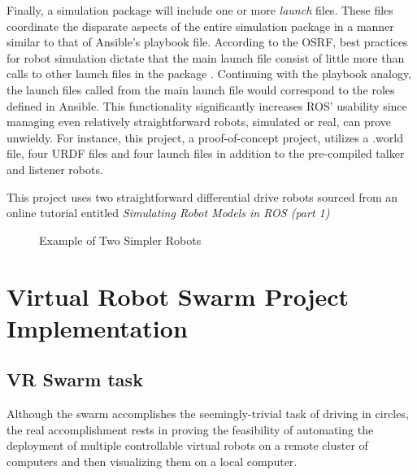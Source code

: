 \documentclass[9pt,twocolumn,twoside]{../../styles/osajnl}
\begin{document}
Finally, a simulation package will include one or more \textit{launch} files.  These files coordinate the disparate aspects of the entire simulation package in a manner similar to that of Ansible's playbook file.  According to the OSRF, best practices for robot simulation dictate that the main launch file consist of little more than calls to other launch files in the package \cite{www-ros-launch}.  Continuing with the playbook analogy, the launch files called from the main launch file would correspond to the roles defined in Ansible.  This functionality significantly increases ROS' usability since managing even relatively straightforward robots, simulated or real, can prove unwieldy. For instance, this project, a proof-of-concept project, utilizes a .world file, four URDF files and four launch files in addition to the pre-compiled talker and listener robots.  

This project uses two straightforward differential drive robots sourced from an online tutorial entitled \textit{Simulating Robot Models in ROS (part 1)} \cite{www-mybot-moore}


\begin{figure}[htbp]
\centering
{}
\caption{Example of Two Simpler Robots}
\label{fig:simplerRobots}
\end{figure}


\section{Virtual Robot Swarm Project Implementation}
\subsection{VR Swarm task}
Although the swarm accomplishes the seemingly-trivial task of driving in circles, the real accomplishment rests in proving the feasibility of automating the deployment of multiple controllable virtual robots on a remote cluster of computers and then visualizing them on a local computer.
\end{document}
